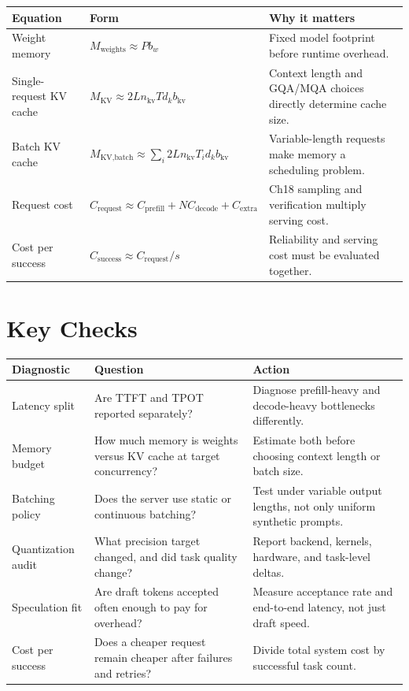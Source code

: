 \begin{center}
\small
\begin{tabularx}{\textwidth}{@{}p{3.6cm}p{5.4cm}X@{}}
\toprule
\textbf{Equation} & \textbf{Form} & \textbf{Why it matters} \\
\midrule
Weight memory & $M_{\text{weights}} \approx P b_w$ & Fixed model footprint before runtime overhead. \\
Single-request KV cache & $M_{\text{KV}} \approx 2Ln_{\text{kv}}Td_kb_{\text{kv}}$ & Context length and GQA/MQA choices directly determine cache size. \\
Batch KV cache & $M_{\text{KV,batch}} \approx \sum_i 2Ln_{\text{kv}}T_id_kb_{\text{kv}}$ & Variable-length requests make memory a scheduling problem. \\
Request cost & $C_{\text{request}} \approx C_{\text{prefill}} + N C_{\text{decode}} + C_{\text{extra}}$ & Ch18 sampling and verification multiply serving cost. \\
Cost per success & $C_{\text{success}} \approx C_{\text{request}}/s$ & Reliability and serving cost must be evaluated together. \\
\bottomrule
\end{tabularx}
\normalsize
\end{center}

\section*{Key Checks}

\begin{center}
\small
\begin{tabularx}{\textwidth}{@{}p{3.8cm}p{5.2cm}X@{}}
\toprule
\textbf{Diagnostic} & \textbf{Question} & \textbf{Action} \\
\midrule
Latency split & Are TTFT and TPOT reported separately? & Diagnose prefill-heavy and decode-heavy bottlenecks differently. \\
Memory budget & How much memory is weights versus KV cache at target concurrency? & Estimate both before choosing context length or batch size. \\
Batching policy & Does the server use static or continuous batching? & Test under variable output lengths, not only uniform synthetic prompts. \\
Quantization audit & What precision target changed, and did task quality change? & Report backend, kernels, hardware, and task-level deltas. \\
Speculation fit & Are draft tokens accepted often enough to pay for overhead? & Measure acceptance rate and end-to-end latency, not just draft speed. \\
Cost per success & Does a cheaper request remain cheaper after failures and retries? & Divide total system cost by successful task count. \\
\bottomrule
\end{tabularx}
\normalsize
\end{center}


